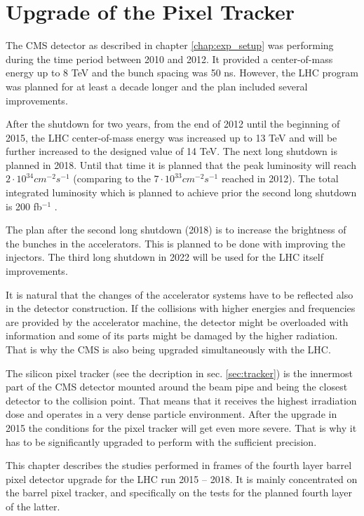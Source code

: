 \chapter{Upgrade of the Pixel Tracker}

The CMS detector as described in chapter \ref{chap:exp_setup} was performing during the time period 
between 2010 and 2012. It provided a center-of-mass energy up to 8 TeV and the bunch spacing was 50 ns. 
However, the LHC program was planned for at least a decade longer and the plan included several improvements.

After the shutdown for two years, from the end of 2012 until the beginning of 2015, the LHC 
center-of-mass energy was increased up to 13 TeV and will be further increased to the designed value
of 14 TeV. The next long shutdown is planned in 2018. Until that time it is planned that the peak
luminosity will reach $2 \cdot 10^{34} cm^{-2} s^{-1}$ (comparing to the $7 \cdot 10^{33} cm^{-2}s^{-1}$
reached in 2012). The total integrated luminosity which is planned to achieve prior the second long shutdown
is 200 fb$^{-1}$ \cite{CMS:2012sda}.

The plan after the second long shutdown (2018) is to increase the brightness of the bunches
in the accelerators. This is planned to be done with improving the injectors. The third long shutdown in 2022
will be used for the LHC itself improvements.

It is natural that the changes of the accelerator systems have to be reflected also in the detector construction.
If the collisions with higher energies and frequencies are provided by the accelerator machine, the detector might
be overloaded with information and some of its parts might be damaged by the higher radiation. That is why 
the CMS is also being upgraded simultaneously with the LHC.

The silicon pixel tracker (see the decription in sec. \ref{sec:tracker}) is the innermost part of the CMS 
detector mounted around the beam pipe and being the closest detector to the collision point. That means that
it receives the highest irradiation dose and operates in a very dense particle environment. After the upgrade 
in 2015 the conditions for the pixel tracker will get even more severe. That is why it has to be significantly 
upgraded to perform with the sufficient precision. 

This chapter describes the studies performed in frames of the fourth layer barrel pixel detector upgrade for the
LHC run 2015 -- 2018. It is mainly concentrated on the barrel pixel tracker, and specifically on the tests for the
planned fourth layer of the latter.

